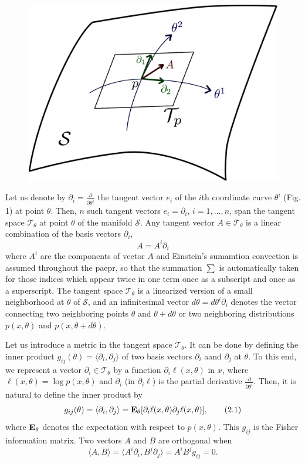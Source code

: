 \documentclass[11pt]{article}
\begin{document}
\begin{figure}[h]
\centering
\includegraphics[scale = 0.3]{fig1.pdf}
\caption{}
\end{figure}

Let us denote by $\partial_i = \frac{\partial}{\partial \theta^i}$ the tangent vector $e_i$ of the $i$th
coordinate curve $\theta^i$ (Fig. 1) at point $\theta$.  Then, $n$ such tangent vectors $e_i = \partial_i$,
$i = 1, \hdots, n$, span the tangent space $\mathcal{T}_\theta$ at point $\theta$ of the manifold $\mathcal{S}$.
Any tangent vector $A \in \mathcal{T}_\theta$ is a linear combination of the basis vectors $\partial_i$,
\[
A = A^i \partial_i
\]
where $A^i$ are the components of vector $A$ and Einstein's sumamtion convection is
assumed throughout the paepr, so that the summation $\sum$ is automatically taken
for those indices which appear twice in one term once as a subscript and once as
a superscript.  The tangent space $\mathcal{T}_\theta$ is a linearized version of a small
neighborhood at $\theta$ of $\mathcal{S}$, and an infinitesimal vector $d\theta = d\theta^i \partial_i$ denotes the vector
connecting two neighboring points $\theta$ and $\theta + d\theta$ or two neighboring distributions
$p(x, \theta)$ and $p(x, \theta + d\theta)$.

Let us introduce a metric in the tangent space $\mathcal{T}_\theta$.
It can be done by defining the inner product $g_{ij}(\theta) = \langle
\partial_i, \partial_j \rangle$ of two basis vectors $\partial_i$ aand
$\partial_j$ at $\theta$.  To this end, we represent a vector
$\partial_i \in \mathcal{T}_\theta$ by a function $\partial_i \ell(x,
\theta)$ in $x$, where $\ell(x, \theta) = \log p(x, \theta)$ and
$\partial_i$ (in $\partial_i \ell$) is the partial derivative
$\frac{\partial}{\partial \theta^i}$.
Then, it is natural to define the inner product by
\begin{equation}
g_{ij}(\theta) = \langle \partial_i, \partial_j \rangle = 
\textbf{E}_\theta[\partial_i \ell(x, \theta)\partial_j \ell(x,\theta)],\tag{2.1}\label{eq:2.1}
\end{equation}
where $\textbf{E}_\theta$ denotes the expectation with respect to $p(x, \theta)$. This $g_{ij}$ is the
Fisher information matrix. Two vectors $A$ and $B$ are orthogonal when
\[
\langle A, B \rangle = \langle A^i \partial_i, B^j \partial_j \rangle = A^i B^j g_{ij} = 0.
\]
\end{document}
